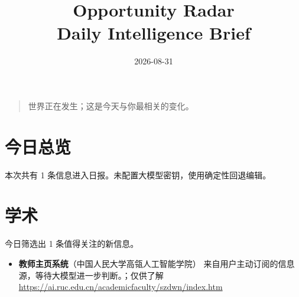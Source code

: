 \documentclass[11pt]{ctexart}
\title{Opportunity Radar\\Daily Intelligence Brief}
\date{2026-08-31}
\begin{document}
\maketitle
\begin{quote}\Large 世界正在发生；这是今天与你最相关的变化。\end{quote}
\section*{今日总览}
本次共有 1 条信息进入日报。未配置大模型密钥，使用确定性回退编辑。
\section*{学术}
今日筛选出 1 条值得关注的新信息。
\begin{itemize}
\item \textbf{教师主页系统}（中国人民大学高瓴人工智能学院） 来自用户主动订阅的信息源，等待大模型进一步判断。；仅供了解 \url{https://ai.ruc.edu.cn/academicfaculty/szdwn/index.htm}
\end{itemize}
\end{document}
